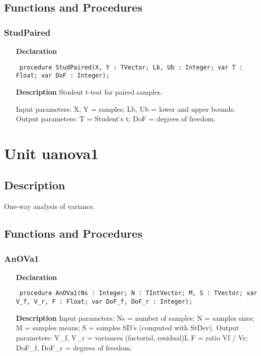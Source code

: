 \documentclass[12pt,a4paper,oneside]{report}
\newcommand{\declarationitem}[1]{\textbf{#1}}
\newcommand{\descriptiontitle}[1]{\textbf{#1}}
\newcommand{\code}[1]{\texttt{#1}}
\begin{document}
\subsection{Functions and Procedures}
\subsubsection{StudPaired}
\label{ustdpair-StudPaired}
\begin{itemize}\item[\declarationitem{Declaration}\hfill]
	\begin{flushleft}
		\code{
			procedure StudPaired(X, Y : TVector; Lb, Ub : Integer; var T : Float; var DoF : Integer);}
	\end{flushleft}
	\item[\descriptiontitle{Description}]
	Student t{-}test for paired samples.
	
	Input parameters: X, Y = samples; Lb, Ub = lower and upper bounds. Output parameters: T = Student's t; DoF = degrees of freedom.
\end{itemize}

\section{Unit uanova1}
\label{uanova1}
\subsection{Description}
One{-}way analysis of variance. 
\subsection{Functions and Procedures}
\subsubsection{AnOVa1}
\label{uanova1-AnOVa1}
\begin{itemize}\item[\declarationitem{Declaration}\hfill]
	\begin{flushleft}
		\code{
			procedure AnOVa1(Ns : Integer; N : TIntVector; M, S : TVector; var V{\_}f, V{\_}r, F : Float; var DoF{\_}f, DoF{\_}r : Integer);}
	\end{flushleft}
	\item[\descriptiontitle{Description}]
	Input parameters: Ns = number of samples; N = samples sizes; M = samples means; S = samples SD's (computed with StDev). Output parameters: V{\_}f, V{\_}r = variances (factorial, residual)L F = ratio Vf / Vr; DoF{\_}f, DoF{\_}r = degrees of freedom.
\end{itemize}
\end{document}
